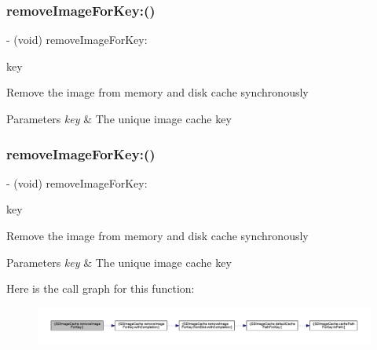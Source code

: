 \subsubsection{\texorpdfstring{remove\+Image\+For\+Key\+:()}{removeImageForKey:()}\hspace{0.1cm}{\footnotesize\ttfamily [2/3]}}
{\footnotesize\ttfamily -\/ (void) remove\+Image\+For\+Key\+: \begin{DoxyParamCaption}\item[{(N\+S\+String $\ast$)}]{key }\end{DoxyParamCaption}}

Remove the image from memory and disk cache synchronously


\begin{DoxyParams}{Parameters}
{\em key} & The unique image cache key \\
\hline
\end{DoxyParams}
\mbox{\label{interface_s_d_image_cache_a1d6ca2afef59216e0cb1740d431833cf}} 
\subsubsection{\texorpdfstring{remove\+Image\+For\+Key\+:()}{removeImageForKey:()}\hspace{0.1cm}{\footnotesize\ttfamily [3/3]}}
{\footnotesize\ttfamily -\/ (void) remove\+Image\+For\+Key\+: \begin{DoxyParamCaption}\item[{(N\+S\+String $\ast$)}]{key }\end{DoxyParamCaption}}

Remove the image from memory and disk cache synchronously


\begin{DoxyParams}{Parameters}
{\em key} & The unique image cache key \\
\hline
\end{DoxyParams}
Here is the call graph for this function\+:\nopagebreak
\begin{figure}[H]
\begin{center}
\leavevmode
\includegraphics[width=350pt]{interface_s_d_image_cache_a1d6ca2afef59216e0cb1740d431833cf_cgraph}
\end{center}
\end{figure}
\mbox{\label{interface_s_d_image_cache_a61cf4a9222043f0b302b8fdb0b522e3f}} 

